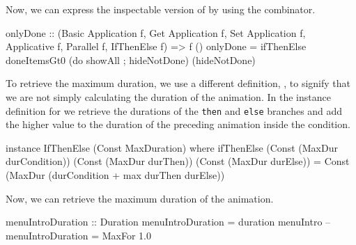 Now, we can express the inspectable version of  by using the  combinator.

\begin{code}
onlyDone :: (Basic Application f, Get Application f,
  Set Application f, Applicative f, Parallel f, IfThenElse f)
  => f ()
onlyDone = ifThenElse doneItemsGt0
  (do showAll ; hideNotDone)
  (hideNotDone)
\end{code}

To retrieve the maximum duration, we use a different  definition, , to signify that we are not simply calculating the duration of the animation. In the instance definition for  we retrieve the durations of the \texttt{then} and \texttt{else} branches and add the higher value to the duration of the preceding animation inside the condition.

\begin{code}
instance IfThenElse (Const MaxDuration) where
  ifThenElse (Const (MaxDur durCondition))
             (Const (MaxDur durThen))
             (Const (MaxDur durElse)) =
    Const (MaxDur (durCondition + max durThen durElse))
\end{code}

Now, we can retrieve the maximum duration of the  animation.

\begin{spec}
menuIntroDuration :: Duration
menuIntroDuration = duration menuIntro
-- menuIntroDuration = MaxFor 1.0
\end{spec}
